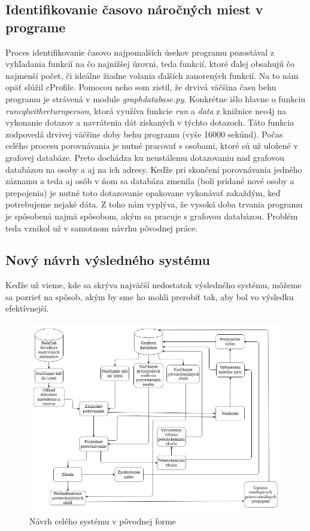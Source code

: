 \subsection{Identifikovanie časovo náročných miest v programe}
Proces identifikovanie časovo najpomalších úsekov programu pozostával z vyhľadania funkcií na čo najnižšej úrovni, teda funkcií, ktoré ďalej obsahujú čo najmenší počet, či ideálne žiadne volania ďalších zanorených funkcií. Na to nám opäť slúžil cProfile. Pomocou neho som zistil, že drvivá väčšina času behu programu je strávená v module \textit{graph\textunderscore database.py}. Konkrétne išlo hlavne o funkciu \textit{run\textunderscore cql\textunderscore with\textunderscore return\textunderscore person}, ktorá využíva funkcie \textit{run} a \textit{data} z knižnice neo4j na vykonanie dotazov a navrátenia dát získaných v týchto dotazoch. Táto funkcia zodpovedá drvivej väčšine doby behu programu (vyše 16000 sekúnd). Počas celého procesu porovnávania je nutné pracovať s osobami, ktoré sú už uložené v grafovej databáze. Preto dochádza ku neustálemu dotazovaniu nad grafovou databázou na osoby a aj na ich adresy. Keďže pri skončení porovnávania jedného záznamu a teda aj osôb v ňom sa databáza zmenila (boli pridané nové osoby a prepojenia) je nutné toto dotazovanie opakovane vykonávať zakaždým, keď potrebujeme nejaké dáta. Z toho nám vyplýva, že vysoká doba trvania programu je spôsobená najmä spôsobom, akým sa pracuje s grafovou databázou. Problém teda vznikol už v samotnom návrhu pôvodnej práce.

\subsection{Nový návrh výsledného systému}
Keďže už vieme, kde sa skrýva najväčší nedostatok výsledného systému, môžeme sa pozrieť na spôsob, akým by sme ho mohli prerobiť tak, aby bol vo výsledku efektívnejší.

\begin{figure}[t]
\label{system}
\centering
\includegraphics[width=1\textwidth]{obrazky-figures/diagram-original.PNG}
\caption{Návrh celého systému v pôvodnej forme}
\end{figure}

